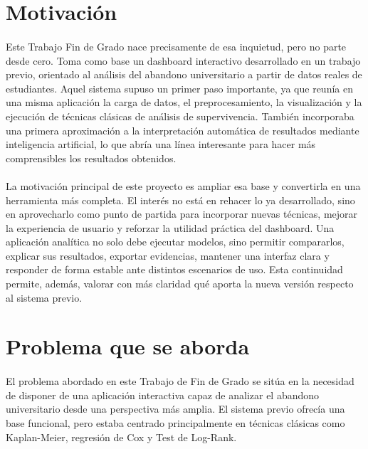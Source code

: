 \section{Motivación}

\paragraph*{}Este Trabajo Fin de Grado nace precisamente de esa inquietud, pero no parte desde cero. Toma como base un dashboard interactivo desarrollado en un trabajo previo, orientado al análisis del abandono universitario a partir de datos reales de estudiantes. Aquel sistema supuso un primer paso importante, ya que reunía en una misma aplicación la carga de datos, el preprocesamiento, la visualización y la ejecución de técnicas clásicas de análisis de supervivencia. También incorporaba una primera aproximación a la interpretación automática de resultados mediante inteligencia artificial, lo que abría una línea interesante para hacer más comprensibles los resultados obtenidos.

\paragraph*{}La motivación principal de este proyecto es ampliar esa base y convertirla en una herramienta más completa. El interés no está en rehacer lo ya desarrollado, sino en aprovecharlo como punto de partida para incorporar nuevas técnicas, mejorar la experiencia de usuario y reforzar la utilidad práctica del dashboard. Una aplicación analítica no solo debe ejecutar modelos, sino permitir compararlos, explicar sus resultados, exportar evidencias, mantener una interfaz clara y responder de forma estable ante distintos escenarios de uso. Esta continuidad permite, además, valorar con más claridad qué aporta la nueva versión respecto al sistema previo.

\section{Problema que se aborda}

\paragraph*{}El problema abordado en este Trabajo de Fin de Grado se sitúa en la necesidad de disponer de una aplicación interactiva capaz de analizar el abandono universitario desde una perspectiva más amplia. El sistema previo ofrecía una base funcional, pero estaba centrado principalmente en técnicas clásicas como Kaplan-Meier, regresión de Cox y Test de Log-Rank.

